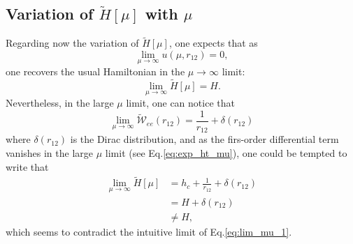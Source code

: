 \documentclass[aip,jcp,reprint,noshowkeys,superscriptaddress]{revtex4-1}
\begin{document}
\subsection{Variation of $\tilde{H}[\mu]$ with $\mu$}
\label{sec:h_mu_lim}
Regarding now the variation of $\tilde{H}[\mu]$, one expects that as 
\begin{equation}
 \label{eq:lim_mu_0}
 \lim_{\mu  \rightarrow \infty }u(\mu,r_{12}) = 0, 
\end{equation}
one recovers the usual Hamiltonian in the ${\mu  \rightarrow \infty }$ limit:
\begin{equation}
 \label{eq:lim_mu_1}
 \lim_{\mu \rightarrow \infty} \tilde{H}[\mu] = H.
\end{equation}
Nevertheless, in the large $\mu$ limit, one can notice that 
\begin{equation}
 \label{eq:lim_mu_3}
 \lim_{\mu \rightarrow \infty} \tilde{\mathcal{W}}_{ee}(r_{12})  = \frac{1}{r_{12}} + \delta(r_{12}) 
\end{equation}
where $\delta(r_{12})$ is the Dirac distribution, and as the firs-order differential term vanishes in the large $\mu$ limit (see Eq.\eqref{eq:exp_ht_mu}), one could be tempted to write that 
\begin{equation}
 \begin{aligned}
 \label{eq:lim_mu_4}
 \lim_{\mu \rightarrow \infty} \tilde{H}[\mu]& = h_c + \frac{1}{r_{12}} + \delta(r_{12}) \\
                                             & = H + \delta(r_{12})  \\
                                             & \ne H,
 \end{aligned}
\end{equation}
which seems to contradict the intuitive limit of Eq.\eqref{eq:lim_mu_1}. 
\end{document}
